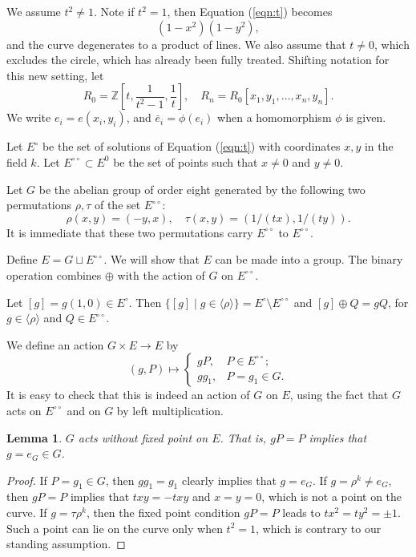 \documentclass[18pt]{article}
\newtheorem{lemma}[theorem]{Lemma}
\newcommand{\ring}[1]{\mathbb{#1}}
\newcommand{\Eo}{E^\circ}
\newcommand{\Eoo}{E^{\circ\circ}}
\newcommand{\Go}{\langle\rho\rangle}
\begin{document}
We assume $t^2\ne 1$.  Note if $t^2=1$, then Equation (\ref{eqn:t})
becomes
\[
(1-x^2)(1-y^2),
\]
and the curve degenerates to a product of lines.  We also assume that
$t\ne 0$, which excludes the circle, which has already been fully
treated.  Shifting notation for this new setting, let
\[
R_0 = \ring{Z}[t,\frac{1}{t^2-1},\frac1t],\quad
R_n = R_0[x_1,y_1,\ldots,x_n,y_n].
\]
We write $e_i = e(x_i,y_i)$, and $\bar e_i = \phi(e_i)$ when a
homomorphism $\phi$ is given.

Let $\Eo$ be the set of solutions of Equation (\ref{eqn:t}) with
coordinates $x,y$ in the field $k$.  Let $\Eoo\subset E^0$ be the set
of points such that $x\ne0$ and $y\ne 0$.

Let $G$ be the abelian group of order eight generated by the following
two permutations $\rho,\tau$ of the set $\Eoo$:
\[
\rho(x,y) = (-y,x),\quad \tau(x,y) = (1/(tx),1/(ty)).
\]
It is immediate that these two permutations carry $\Eoo$ to $\Eoo$.

Define $E = G\sqcup \Eoo$.  We will show that $E$ can be made into a
group.  The binary operation 
combines $\oplus$ with the action of $G$ on $\Eoo$.

Let $[g] = g(1,0)\in \Eo$.  Then $\{[g]\mid g\in \Go\} = \Eo \setminus
\Eoo$ and $[g]\oplus Q = g Q$, for $g\in \Go$ and $Q\in \Eoo$.

We define an action $G\times E\to E$ by
\[
(g,P)\mapsto \begin{cases}g P,& P\in \Eoo;\\
g g_1,& P = g_1\in G.
\end{cases}
\]
It is easy to check that this is indeed an action of $G$ on $E$, using
the fact that $G$ acts on $\Eoo$ and on $G$ by left multiplication.

\begin{lemma}  \label{lemma:no-fix}
  $G$ acts without fixed point on $E$.  That is, $g P = P$ implies
  that $g=e_G\in G$.
\end{lemma}

\begin{proof} If $P=g_1\in G$, then $g g_1 = g_1$ clearly implies that
  $g=e_G$.  If $g = \rho^k\ne e_G$, then $g P = P$ implies that $t x y
  = - t x y$ and $x=y=0$, which is not a point on the curve.  If $g =
  \tau \rho^k$, then the fixed point condition $g P = P$ leads to $t
  x^2 = t y^2 =\pm 1$.  Such a point can lie on the curve only
when $t^2=1$, which is contrary to our standing assumption.
\end{proof}
\end{document}

